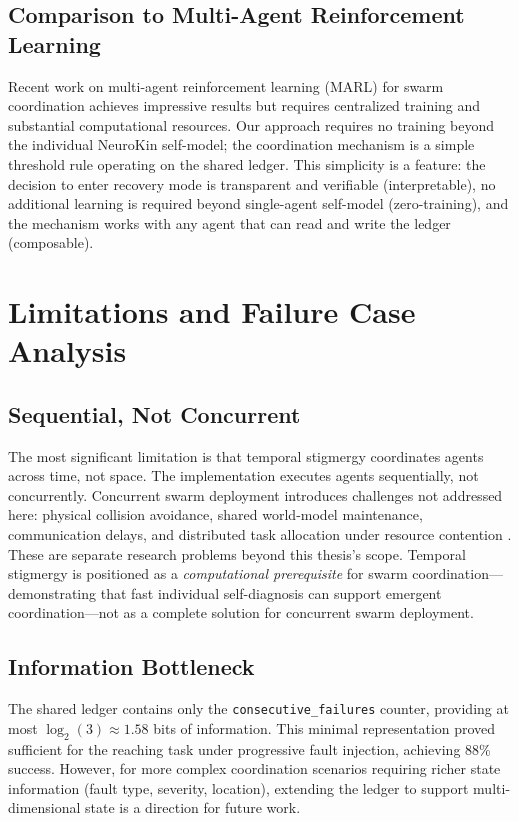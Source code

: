 \documentclass[12pt,a4paper,oneside]{report}
\begin{document}
\subsection{Comparison to Multi-Agent Reinforcement Learning}

Recent work on multi-agent reinforcement learning (MARL) for swarm coordination \cite{domberg2026selfadapting, daneshmand2026slowrl} achieves impressive results but requires centralized training and substantial computational resources. Our approach requires no training beyond the individual NeuroKin self-model; the coordination mechanism is a simple threshold rule operating on the shared ledger. This simplicity is a feature: the decision to enter recovery mode is transparent and verifiable (interpretable), no additional learning is required beyond single-agent self-model (zero-training), and the mechanism works with any agent that can read and write the ledger (composable).

\section{Limitations and Failure Case Analysis}

\subsection{Sequential, Not Concurrent}

The most significant limitation is that temporal stigmergy coordinates agents across time, not space. The implementation executes agents sequentially, not concurrently. Concurrent swarm deployment introduces challenges not addressed here: physical collision avoidance, shared world-model maintenance, communication delays, and distributed task allocation under resource contention \cite{matsuki2024gaussian, keetha2024splattam}. These are separate research problems beyond this thesis's scope. Temporal stigmergy is positioned as a \textit{computational prerequisite} for swarm coordination---demonstrating that fast individual self-diagnosis can support emergent coordination---not as a complete solution for concurrent swarm deployment.

\subsection{Information Bottleneck}

The shared ledger contains only the \texttt{consecutive\_failures} counter, providing at most $\log_2(3) \approx 1.58$ bits of information. This minimal representation proved sufficient for the reaching task under progressive fault injection, achieving 88\% success. However, for more complex coordination scenarios requiring richer state information (fault type, severity, location), extending the ledger to support multi-dimensional state is a direction for future work.
\end{document}
